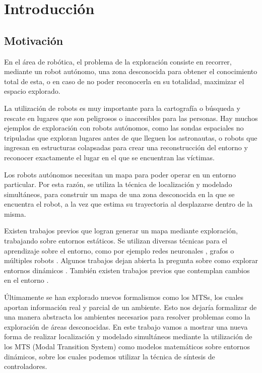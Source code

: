 \chapter{Introducción}

\section{Motivación}

En el área de robótica, el problema de la exploración consiste en recorrer, mediante un robot autónomo, una zona 
desconocida para obtener el conocimiento total de esta, o en caso de no poder reconocerla en su totalidad, maximizar 
el espacio explorado. 

\vspace{\baselineskip}
La utilización de robots es muy importante para la cartografía o búsqueda y rescate en lugares que son peligrosos o 
inaccesibles para las personas. Hay muchos ejemplos de exploración con robots autónomos, como las sondas espaciales 
no tripuladas que exploran lugares antes de que lleguen los astronautas, o robots que ingresan en estructuras colapsadas 
para crear una reconstrucción del entorno y reconocer exactamente el lugar en el que se encuentran las víctimas.

\vspace{\baselineskip}
Los robots autónomos necesitan un mapa para poder operar en un entorno particular. Por esta razón, se utiliza la técnica 
de localización y modelado simultáneos, para construir un mapa de una zona desconocida en la que se encuentra el robot, 
a la vez que estima su trayectoria al desplazarse dentro de la misma.

\vspace{\baselineskip}
Existen trabajos previos que logran generar un mapa mediante exploración, trabajando sobre entornos estáticos. 
Se utilizan diversas técnicas para el aprendizaje sobre el entorno, como por ejemplo redes neuronales \cite{TP2}, 
grafos \cite{TP4} o múltiples robots \cite{TP5}. Algunos trabajos dejan abierta la pregunta sobre como explorar 
entornos dinámicos \cite{TP1} \cite{TP3}. También existen trabajos previos que contemplan cambios en el entorno \cite{TP6}.

\vspace{\baselineskip}
Últimamente se han explorado nuevos formalismos como los MTSs, los cuales aportan información real y parcial de un ambiente.
Esto nos dejaría formalizar de una manera abstracta los ambientes necesarios para resolver problemas como la exploración
de áreas desconocidas. En este trabajo vamos a mostrar una nueva forma de realizar localización y modelado simultáneos mediante
la utilización de los MTS (Modal Transition System) como modelos matemáticos sobre entornos dinámicos, sobre los cuales podemos
utilizar la técnica de síntesis de controladores.

